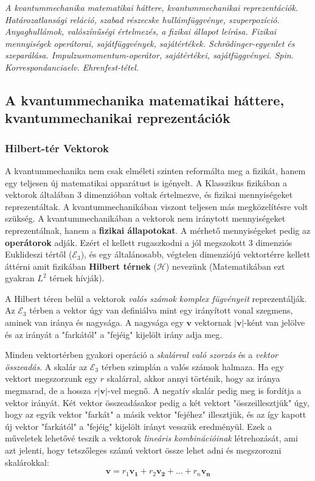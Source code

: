 \documentclass[../main.tex]{subfiles}
\begin{document}
\newcommand{\spinop}{{\fontfamily{qbk}\selectfont \mathbf{S}}}

\textit{A kvantummechanika matematikai háttere, kvantummechanikai reprezentációk. Határozatlansági reláció, szabad részecske hullámfüggvénye, szuperpozíció.
Anyaghullámok, valószínűségi értelmezés, a fizikai állapot leírása. Fizikai mennyiségek operátorai, sajátfüggvények, sajátértékek. Schrödinger-egyenlet és szeparálása.
Impulzusmomentum-operátor, sajátértékei, sajátfüggvényei. Spin. Korrespondanciaelv. Ehrenfest-tétel.}

\subsection{A kvantummechanika matematikai háttere, kvantummechanikai reprezentációk}
\subsubsection{Hilbert-tér Vektorok \cite{quantum_primer}}
A kvantummechanika nem csak elméleti szinten reformálta meg a fizikát, hanem egy teljesen új matematikai apparátust is igényelt.
A Klasszikus fizikában a vektorok általában 3 dimenzióban voltak értelmezve, és fizikai mennyiségeket reprezentáltak. A kvantummechanikában viszont teljesen más megközelítésre volt szükség.
A kvantummechanikában a vektorok nem iránytott mennyiségeket reprezentálnak, hanem a \textbf{fizikai állapotokat}. A mérhető mennyiségeket pedig az \textbf{operátorok} adják.
Ezért el kellett rugaszkodni a jól megszokott 3 dimenziós Euklideszi tértől ($\mathcal{E}_3$), és egy általánosabb, végtelen dimenziójú vektortérre kellett áttérni amit fizikában \textbf{Hilbert térnek} ($\mathcal{H}$) nevezünk (Matematikában ezt gyakran $L^2$ térnek hívják).

A Hilbert téren belül a vektorok \textit{valós számok komplex fügvényeit} reprezentálják. Az $\mathcal{E}_3$ térben a vektor úgy van definiálva mint egy irányított vonal szegmens, aminek van iránya és nagysága.
A nagysága egy $\mathbf{v}$ vektornak $|\mathbf{v}|$-ként van jelölve és az irányát a "farkától" a "fejéig" kijelölt irány adja meg. 

Minden vektortérben gyakori operáció a \textit{skalárral való szorzás} és a \textit{vektor összeadás}. A skalár az $\mathcal{E}_3$ térben szimplán a valós számok halmaza. Ha egy vektort megszorzunk egy $r$ skalárral, akkor annyi történik, hogy az iránya megmarad, de a hossza $r|\mathbf{v}|$-vel megnő.
A negatív skalár pedig meg is fordítja a vektor irányát. Két vektor összeadásakor pedig a két vektort "összeillesztjük" úgy, hogy az egyik vektor "farkát" a másik vektor "fejéhez" illesztjük, és az így kapott új vektor "farkától" a "fejéig" kijelölt irányt vesszük eredményül.
Ezek a műveletek lehetővé teszik a vektorok \textit{lineáris kombinációinak} létrehozását, ami azt jelenti, hogy tetszőleges számú vektort össze lehet adni és megszorozni skalárokkal:
\begin{equation}
    \mathbf{v} = r_1 \mathbf{v_1} + r_2 \mathbf{v_2} + ... + r_n \mathbf{v_n}
\end{equation}
\end{document}
